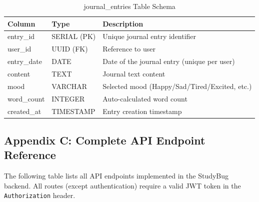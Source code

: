 \begin{table}[htbp]
\centering
\begin{tabular}{|l|l|l|}
\hline
\textbf{Column} & \textbf{Type} & \textbf{Description} \\
\hline
entry\_id & SERIAL (PK) & Unique journal entry identifier \\
user\_id & UUID (FK) & Reference to user \\
entry\_date & DATE & Date of the journal entry (unique per user) \\
content & TEXT & Journal text content \\
mood & VARCHAR & Selected mood (Happy/Sad/Tired/Excited, etc.) \\
word\_count & INTEGER & Auto-calculated word count \\
created\_at & TIMESTAMP & Entry creation timestamp \\
\hline
\end{tabular}
\caption{journal\_entries Table Schema}
\end{table}

\subsection*{Appendix C: Complete API Endpoint Reference}

The following table lists all API endpoints implemented in the StudyBug backend. All routes (except authentication) require a valid JWT token in the \texttt{Authorization} header.

